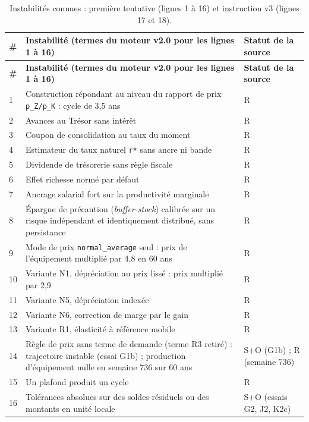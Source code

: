 \documentclass[11pt,a4paper]{article}
\begin{document}
\begin{center}\small
\begin{longtable}{p{0.5cm}p{11.2cm}>{\raggedright\arraybackslash}p{3.0cm}}
\caption{Instabilités connues : première tentative (lignes 1 à 16) et instruction v3 (lignes 17 et 18).}\label{tab:instabilites}\\
\toprule
\textbf{\#} & \textbf{Instabilité (termes du moteur v2.0 pour les lignes 1 à 16)} & \textbf{Statut de la source}\\
\midrule
\endfirsthead
\toprule
\textbf{\#} & \textbf{Instabilité (termes du moteur v2.0 pour les lignes 1 à 16)} & \textbf{Statut de la source}\\
\midrule
\endhead
1 & Construction répondant au niveau du rapport de prix \texttt{p\_Z/p\_K} : cycle de 3,5 ans & R\\
2 & Avances au Trésor sans intérêt & R\\
3 & Coupon de consolidation au taux du moment & R\\
4 & Estimateur du taux naturel \texttt{r*} sans ancre ni bande & R\\
5 & Dividende de trésorerie sans règle fiscale & R\\
6 & Effet richesse normé par défaut & R\\
7 & Ancrage salarial fort sur la productivité marginale & R\\
8 & Épargne de précaution (\emph{buffer-stock}) calibrée sur un risque indépendant et identiquement distribué, sans persistance & R\\
9 & Mode de prix \texttt{normal\_average} seul : prix de l'équipement multiplié par 4,8 en 60 ans & R\\
10 & Variante N1, dépréciation au prix lissé : prix multiplié par 2,9 & R\\
11 & Variante N5, dépréciation indexée & R\\
12 & Variante N6, correction de marge par le gain & R\\
13 & Variante R1, élasticité à référence mobile & R\\
14 & Règle de prix sans terme de demande (terme R3 retiré) : trajectoire instable (essai G1b) ; production d'équipement nulle en semaine 736 sur 60 ans & S+O (G1b) ; R (semaine 736)\\
15 & Un plafond produit un cycle & R\\
16 & Tolérances absolues sur des soldes résiduels ou des montants en unité locale & S+O (essais G2, J2, K2c)\\

\end{longtable}
\end{center}
\end{document}
